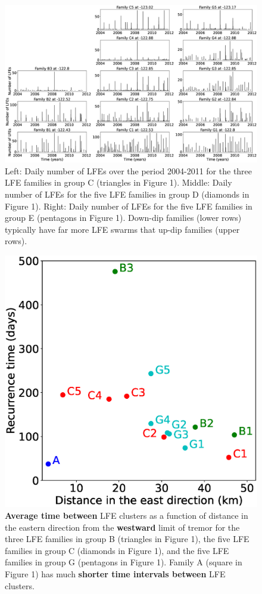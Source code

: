 \documentclass[draft]{agujournal2019}
\begin{document}
\begin{figure}
\noindent\includegraphics[width=\textwidth, trim={0cm 0cm 0cm 0cm},clip]{figures/set_daily_LFEs.eps}
\caption{Left: Daily number of LFEs over the period 2004-2011 for the three LFE families in group C (triangles in Figure 1). Middle: Daily number of LFEs for the five LFE families in group D (diamonds in Figure 1). Right: Daily number of LFEs for the five LFE families in group E (pentagons in Figure 1). Down-dip families (lower rows) typically have far more LFE swarms that up-dip families (upper rows).}
\label{pngfiguresample}
\end{figure}

\begin{figure}
\noindent\includegraphics[width=\textwidth, trim={0cm 0cm 0cm 0cm},clip]{figures/nb_LFE_events.eps}
\caption{\textbf{Average time between} LFE clusters as a function of distance in the eastern direction from the \textbf{westward} limit of tremor for the three LFE families in group B (triangles in Figure 1), the five LFE families in group C (diamonds in Figure 1), and the five LFE families in group G (pentagons in Figure 1). Family A (square in Figure 1) has much \textbf{shorter time intervals between } LFE clusters.}
\label{pngfiguresample}
\end{figure}
\end{document}
